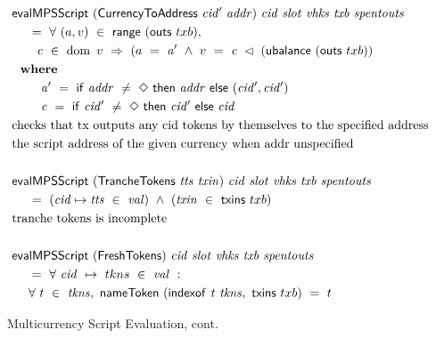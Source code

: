 \begin{figure*}[htb]
  \begin{align*}
    & \mathsf{evalMPSScript}
     ~(\mathsf{CurrencyToAddress}~\mathit{cid'}~\mathit{addr})~\mathit{cid}~ \mathit{slot}~\mathit{vhks} ~\mathit{txb}~\mathit{spentouts} \\
    &~~~~ =~ \forall~(a, v)~\in~\mathsf{range}~(\mathsf{outs}~txb),~\\
    &~~~~~~ \mathit{c}~\in~\operatorname{dom}~v~\Rightarrow~(a~=~ \mathit{a'} ~\wedge~
                       v~=~\mathit{c}~ \lhd~(\mathsf{ubalance}~(\mathsf{outs}~txb)) \\
    & ~ ~ \mathbf{where}~ ~  \\
    & ~~~~~~~ \mathit{a'}~=~\mathsf{if}~ \mathit{addr}~\neq~\Diamond~\mathsf{then}~\mathit{addr}~\mathsf{else}~\mathit{(cid',cid')} \\
    & ~~~~~~~ \mathit{c}~=~\mathsf{if}~ \mathit{cid'}~\neq~\Diamond~\mathsf{then}~\mathit{cid'}~\mathsf{else}~\mathit{cid} \\
    & \text{checks that tx outputs any cid tokens by themselves to the specified address} \\
    & \text {the script address of the given currency when addr unspecified} \\~\\
    & \mathsf{evalMPSScript}
     ~(\mathsf{TrancheTokens}~\mathit{tts}~\mathit{txin})~\mathit{cid}~\mathit{slot}~\mathit{vhks}
     ~\mathit{txb}~\mathit{spentouts}  \\
    &~~~~ =~(\mathit{cid}\mapsto\mathit{tts}~\in~\mathit{val})~ \wedge~(\mathit{txin}~\in~\mathsf{txins}~{txb}) \\
    & \text{tranche tokens is incomplete} \\~\\
    & \mathsf{evalMPSScript}
     ~(\mathsf{FreshTokens})~\mathit{cid}~\mathit{slot}~\mathit{vhks}
     ~\mathit{txb}~\mathit{spentouts}
      \\
    &~~~~ =~\forall~\mathit{cid}~ \mapsto ~tkns ~\in~ \mathit{val}~:~ \\
    &~~~~ \forall~t~\in~\mathit{tkns},~
        \mathsf{nameToken}~(\mathsf{indexof}~\mathit{t}~\mathit{tkns},~\mathsf{txins}~{txb})~=~t
    \end{align*}
    \caption{Multicurrency Script Evaluation, cont.}
    \label{fig:defs:tx-mc-eval-3}
\end{figure*}


